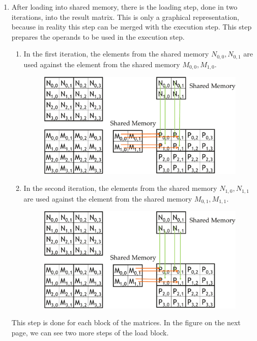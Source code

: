 \begin{enumerate}
    \newpage
    \item After loading into shared memory, there is the loading step, done in two iterations, into the result matrix. This is only a graphical representation, because in reality this step can be merged with the execution step. This step prepares the operands to be used in the execution step.
    \begin{enumerate}
        \item In the first iteration, the elements from the shared memory $N_{0,0}, N_{0,1}$ are used against the element from the shared memory $M_{0,0}, M_{1,0}$.
        \begin{figure}[!htp]
            \centering
            \includegraphics[width=.8\textwidth]{img/cuda-tiled-matrix-multiplication-2.pdf}
        \end{figure}
        \item In the second iteration, the elements from the shared memory $N_{1,0}, N_{1,1}$ are used against the element from the shared memory $M_{0,1}, M_{1,1}$.
        \begin{figure}[!htp]
            \centering
            \includegraphics[width=.8\textwidth]{img/cuda-tiled-matrix-multiplication-3.pdf}
        \end{figure}
    \end{enumerate}
    This step is done for each block of the matrices. In the figure on the next page, we can see two more steps of the load block.
    \newpage
    \begin{figure}[!htp]

\end{figure}
\end{enumerate}
